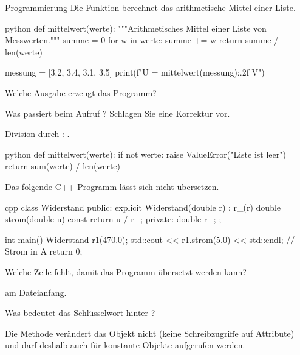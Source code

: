 \documentclass{uebungsblatt}
\begin{document}
\begin{aufgabe}{Programmierung}
Die Funktion  berechnet das arithmetische Mittel einer Liste.

\begin{codeblock}[mittelwert.py]{python}
def mittelwert(werte):
    """Arithmetisches Mittel einer Liste von Messwerten."""
    summe = 0
    for w in werte:
        summe += w
    return summe / len(werte)

messung = [3.2, 3.4, 3.1, 3.5]
print(f"U = {mittelwert(messung):.2f} V")
\end{codeblock}

\begin{teilaufgaben}
   Welche Ausgabe erzeugt das Programm?
    \begin{loesung}
       
    \end{loesung}
   Was passiert beim Aufruf ? Schlagen Sie
           eine Korrektur vor.
    \begin{loesung}
      Division durch : . 
      \begin{codeblock}[Korrektur]{python}
def mittelwert(werte):
    if not werte:
        raise ValueError("Liste ist leer")
    return sum(werte) / len(werte)
      \end{codeblock}
    \end{loesung}
\end{teilaufgaben}

\neueseite
Das folgende C++-Programm lässt sich nicht übersetzen.

\begin{codeblock}{cpp}
class Widerstand {
public:
    explicit Widerstand(double r) : r_(r) {}
    double strom(double u) const { return u / r_; }
private:
    double r_;
};

int main() {
    Widerstand r1(470.0);
    std::cout << r1.strom(5.0) << std::endl;   // Strom in A
    return 0;
}
\end{codeblock}

\begin{teilaufgaben}[resume]
   Welche Zeile fehlt, damit das Programm übersetzt werden kann?
    \begin{loesung}
       am Dateianfang. 
    \end{loesung}
   Was bedeutet das Schlüsselwort  hinter ?
    \begin{loesung}
      Die Methode verändert das Objekt nicht (keine Schreibzugriffe auf
      Attribute) 
      und darf deshalb auch für konstante Objekte aufgerufen werden. 
    \end{loesung}
\end{teilaufgaben}
\end{aufgabe}
\end{document}
